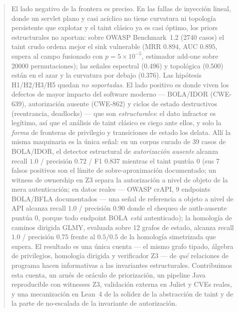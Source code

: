 \documentclass[11pt]{article}
\begin{document}
\begin{abstract}
El lado negativo de la frontera es preciso. En las fallas de inyección lineal,
donde un servlet plano y casi acíclico no tiene curvatura ni topología
persistente que explotar y el taint clásico ya es casi óptimo, los priors
estructurales no aportan: sobre OWASP Benchmark~1.2 (2740 casos) el taint crudo
ordena mejor el sink vulnerable (MRR $0.894$, AUC $0.895$, supera al campo
fusionado con $p=5\times10^{-5}$, estimador add-one sobre 20000 permutaciones);
las señales espectral ($0.496$) y topológica ($0.500$) están en el azar y la
curvatura por debajo ($0.376$). Las hipótesis H1/H2/H3/H5 quedan \emph{no
soportadas}. El lado positivo es donde viven los defectos de mayor impacto del
software moderno --- BOLA/IDOR (CWE-639), autorización ausente (CWE-862) y ciclos
de estado destructivos (reentrancia, deadlocks) --- que son \emph{estructurales}:
el dato infractor es legítimo, así que el análisis de taint clásico es ciego ante
ellos, y solo la \emph{forma} de fronteras de privilegio y transiciones de estado
los delata. Allí la misma maquinaria es la única señal: en un corpus curado de
39 casos de BOLA/IDOR, el detector estructural de \emph{autorización ausente}
alcanza recall $1.0$ / precisión $0.72$ / F1 $0.837$ mientras el taint puntúa $0$
(sus 7 falsos positivos son el límite de sobre-aproximación documentado; un
witness de ownership en Z3 separa la autorización a nivel de objeto de la mera
autenticación; en datos reales --- OWASP crAPI, 9 endpoints BOLA/BFLA
documentados --- una señal de referencia a objeto a nivel de API alcanza recall
$1.0$ / precisión $0.90$ donde el chequeo de auth-ausente puntúa $0$, porque todo
endpoint BOLA \emph{está} autenticado); la homología de caminos dirigida GLMY,
evaluada sobre 12 grafos
de estado, alcanza recall $1.0$ / precisión $0.75$ frente al $0.5$/$0.5$ de la
homología simetrizada que supera. El
resultado es una única cuenta --- el mismo grafo tipado, álgebra de privilegios,
homología dirigida y verificador Z3 --- de \emph{qué} relaciones de programa
hacen informativas a las invariantes estructurales. Contribuimos esta cuenta, un
arnés de oráculo de priorización, un pipeline Java reproducible con witnesses Z3,
validación externa en Juliet y CVEs reales, y una mecanización en Lean~4 de la
solidez de la abstracción de taint y de la parte de no-escalada de la invariante
de autorización.
\end{abstract}
\end{document}
